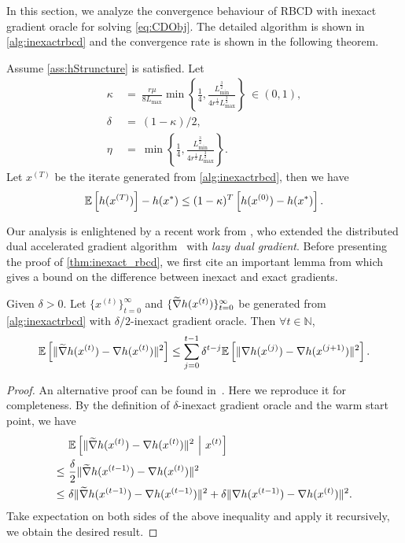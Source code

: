 In this section, we analyze the convergence behaviour of RBCD with inexact gradient oracle for solving \autoref{eq:CDObj}. The detailed algorithm is shown in \autoref{alg:inexactrbcd} and the convergence rate is shown in the following theorem. 
\begin{theorem} \label{thm:inexact_rbcd}
    Assume \autoref{ass:hStruncture} is satisfied. Let
    \begin{align}
        \kappa &~=~ \frac{ r \mu }{ 8 L_{\max}} \min \left\{ \frac{1}{4}, \frac{L_{\min}^{\frac{3}{2}}}{4 r^{\frac{1}{2}} L_{\max}^{\frac{3}{2}} } \right\} ~\in (0,1), \nonumber \\
        \delta &~=~ (1-\kappa) / 2, \nonumber \\
        \eta &~=~ \min \left\{ \frac{1}{4}, \frac{L_{\min}^{\frac{3}{2}}}{4 r^{\frac{1}{2}} L_{\max}^{\frac{3}{2}} } \right\}.
    \end{align} 
    Let $x^{(T)}$ be the iterate generated from \autoref{alg:inexactrbcd}, then we have 
    \[\mathbb{E}\left[h(x^{(T)})\right] - h(x^*) \leq (1-\kappa)^T\left[h(x^{(0)}) - h(x^*) \right]. \]
\end{theorem}

Our analysis is enlightened by a recent work from \citet{LiuSY21}, who extended the distributed dual accelerated gradient algorithm~\citep{Scaman2017OptimalAF} with \emph{lazy dual gradient}. Before presenting the proof of \autoref{thm:inexact_rbcd}, we first cite an important lemma from \citep{LiuSY21} which gives a bound on the difference between inexact and exact gradients. 
\begin{lemma} \label{lemma:LiuLemma1}
    Given $\delta > 0$. Let $\{ x^{(t)} \}_{t=0}^{\infty}$ and $\{ \widetilde{\nabla} h(x^{(t)}) \}_{t=0}^{\infty}$ be generated from \autoref{alg:inexactrbcd} with $\delta/2$-inexact gradient oracle. Then $\forall t \in \mathbb{N}$,
    \begin{align}
        \mathbb{E}\left[\| \widetilde{\nabla} h(x^{(t)}) - {\nabla} h(x^{(t)}) \|^2 \right] \leq \sum_{j=0}^{t-1} \delta^{t-j} \mathbb{E} \left[ \| \nabla h(x^{(j)}) - {\nabla} h(x^{(j+1)}) \|^2 \right]. \label{eq:recursiveGradDiff}
    \end{align}
\end{lemma}
\begin{proof}
An alternative proof can be found in~\citet[Appendix A]{LiuSY21}. Here we reproduce it for completeness. By the definition of $\delta$-inexact gradient oracle and the warm start point, we have
\begin{align*}
         &~\mathbb{E}\left[\| \widetilde{\nabla} h(x^{(t)}) - {\nabla} h(x^{(t)}) \|^2 ~\Big|~ x^{(t)} \right] \\
    \leq &~\frac{\delta}{2} \| \widetilde{\nabla} h(x^{(t-1)}) - {\nabla} h(x^{(t)}) \|^2 \\
    \leq &~\delta \| \widetilde{\nabla} h(x^{(t-1)}) - {\nabla} h(x^{(t-1)}) \|^2 + \delta \| {\nabla} h(x^{(t-1)}) - {\nabla} h(x^{(t)}) \|^2 .
\end{align*}
Take expectation on both sides of the above inequality and apply it recursively, we obtain the desired result.
\end{proof}

